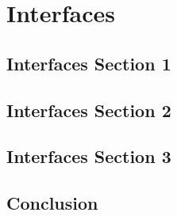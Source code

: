 %
\chapter{Interfaces}
\label{ch:interfaces}


\Blindtext[2][1]

\section{Interfaces Section 1}
\label{sec:interfaces:sec1}

\Blindtext[2][2]

\section{Interfaces Section 2}
\label{sec:interfaces:sec2}

\Blindtext[3][2]

\section{Interfaces Section 3}
\label{sec:interfaces:sec3}

\Blindtext[4][2]

\section{Conclusion}
\label{sec:interfaces:conclusion}

\Blindtext[2][1]

